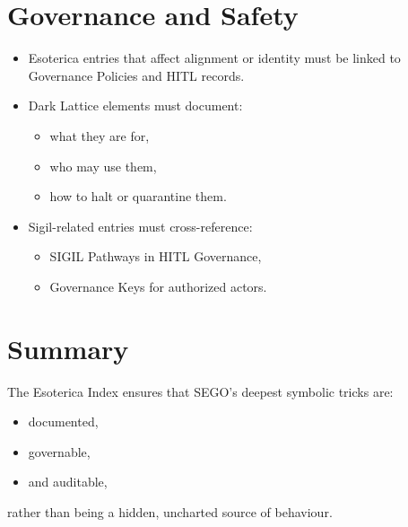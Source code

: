 \section{Governance and Safety}

\begin{itemize}
    \item Esoterica entries that affect alignment or identity must be linked
          to Governance Policies and HITL records.
    \item Dark Lattice elements must document:
          \begin{itemize}
              \item what they are for,
              \item who may use them,
              \item how to halt or quarantine them.
          \end{itemize}
    \item Sigil-related entries must cross-reference:
          \begin{itemize}
              \item SIGIL Pathways in HITL Governance,
              \item Governance Keys for authorized actors.
          \end{itemize}
\end{itemize}

\section{Summary}

The Esoterica Index ensures that SEGO’s deepest symbolic tricks are:
\begin{itemize}
    \item documented,
    \item governable,
    \item and auditable,
\end{itemize}
rather than being a hidden, uncharted source of behaviour.
